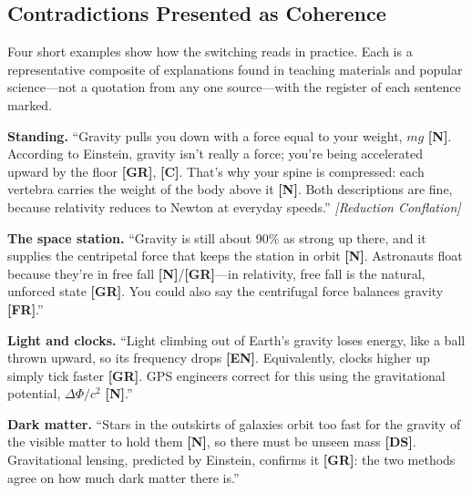 \documentclass[11pt,a4paper]{article}
\newcommand{\reg}[1]{\textsf{\small\textbf{[#1]}}}
\newcommand{\RN}{\reg{N}}
\newcommand{\RGR}{\reg{GR}}
\newcommand{\RFR}{\reg{FR}}
\newcommand{\RC}{\reg{C}}
\newcommand{\REN}{\reg{EN}}
\newcommand{\RDS}{\reg{DS}}
\begin{document}
\subsection{Contradictions Presented as Coherence}

Four short examples show how the switching reads in practice. Each is a representative composite of explanations found in teaching materials and popular science---not a quotation from any one source---with the register of each sentence marked.

\begin{tcolorbox}[colback=black!3,colframe=black!25,boxrule=0.4pt,arc=2pt,left=8pt,right=8pt,top=6pt,bottom=6pt]
\textbf{Standing.} ``Gravity pulls you down with a force equal to your weight, $mg$ \RN{}. According to Einstein, gravity isn't really a force; you're being accelerated upward by the floor \RGR{}, \RC{}. That's why your spine is compressed: each vertebra carries the weight of the body above it \RN{}. Both descriptions are fine, because relativity reduces to Newton at everyday speeds.'' \emph{[Reduction Conflation]}
\end{tcolorbox}

\begin{tcolorbox}[colback=black!3,colframe=black!25,boxrule=0.4pt,arc=2pt,left=8pt,right=8pt,top=6pt,bottom=6pt]
\textbf{The space station.} ``Gravity is still about 90\% as strong up there, and it supplies the centripetal force that keeps the station in orbit \RN{}. Astronauts float because they're in free fall \RN{}/\RGR{}---in relativity, free fall is the natural, unforced state \RGR{}. You could also say the centrifugal force balances gravity \RFR{}.''
\end{tcolorbox}

\begin{tcolorbox}[colback=black!3,colframe=black!25,boxrule=0.4pt,arc=2pt,left=8pt,right=8pt,top=6pt,bottom=6pt]
\textbf{Light and clocks.} ``Light climbing out of Earth's gravity loses energy, like a ball thrown upward, so its frequency drops \REN{}. Equivalently, clocks higher up simply tick faster \RGR{}. GPS engineers correct for this using the gravitational potential, $\Delta\Phi/c^2$ \RN{}.''
\end{tcolorbox}

\begin{tcolorbox}[colback=black!3,colframe=black!25,boxrule=0.4pt,arc=2pt,left=8pt,right=8pt,top=6pt,bottom=6pt]
\textbf{Dark matter.} ``Stars in the outskirts of galaxies orbit too fast for the gravity of the visible matter to hold them \RN{}, so there must be unseen mass \RDS{}. Gravitational lensing, predicted by Einstein, confirms it \RGR{}: the two methods agree on how much dark matter there is.''
\end{tcolorbox}
\end{document}
